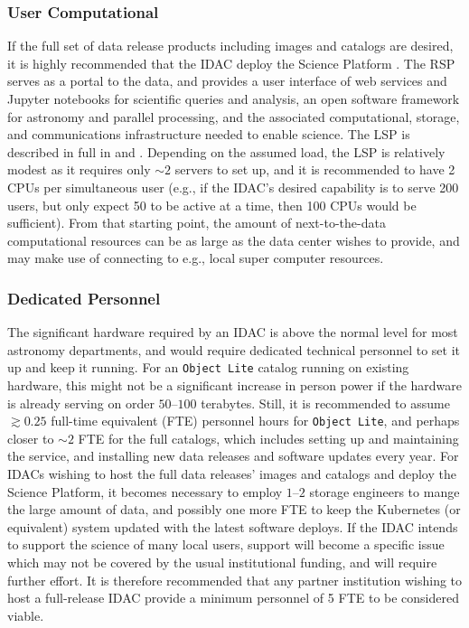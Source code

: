 \subsubsection{User Computational}
If the full set of data release products including images and catalogs are desired, it is highly recommended that the \gls{IDAC} deploy the \RO \gls{Science Platform} . The \gls{RSP} serves as a portal to the data, and provides a user interface of web services and Jupyter notebooks for scientific queries and analysis, an open software framework for astronomy and parallel processing, and the associated computational, storage, and communications infrastructure needed to enable science. The \gls{LSP} is described in full in  and . Depending on the assumed load, the \gls{LSP} is relatively modest as it requires only $\sim2$ servers to set up, and it is recommended to have 2 CPUs per simultaneous user (e.g., if the \gls{IDAC}'s desired capability is to serve 200 users, but only expect 50 to be active at a time, then 100 CPUs would be sufficient). From that starting point, the amount of next-to-the-data computational resources can be as large as the data center wishes to provide, and may make use of connecting to e.g., local super computer resources.

\subsubsection{Dedicated Personnel}
The significant hardware required by an \gls{IDAC} is above the normal level for most astronomy departments, and would require dedicated technical personnel to set it up and keep it running. For an {\tt Object Lite} catalog running on existing hardware, this might not be a significant increase in person power if the hardware is already serving on order $50$--$100$ terabytes. Still, it is recommended to assume $\gtrsim0.25$ full-time equivalent (\gls{FTE}) personnel hours for {\tt Object Lite}, and perhaps closer to $\sim2$ \gls{FTE} for the full catalogs, which includes setting up and maintaining the service, and installing new data releases and software updates every year. For IDACs wishing to host the full data releases' images and catalogs and deploy the \RO \gls{Science Platform}, it becomes necessary to employ $1$--$2$ storage engineers to mange the large amount of data, and possibly one more \gls{FTE} to keep the \gls{Kubernetes} (or equivalent) system updated with the latest software deploys. If the \gls{IDAC} intends to support the science of many local users, support will become a specific issue which may not be covered by the usual institutional funding, and will require further effort. It is therefore recommended that any partner institution wishing to host a full-release \gls{IDAC} provide a minimum personnel of 5 \gls{FTE} to be considered viable.

